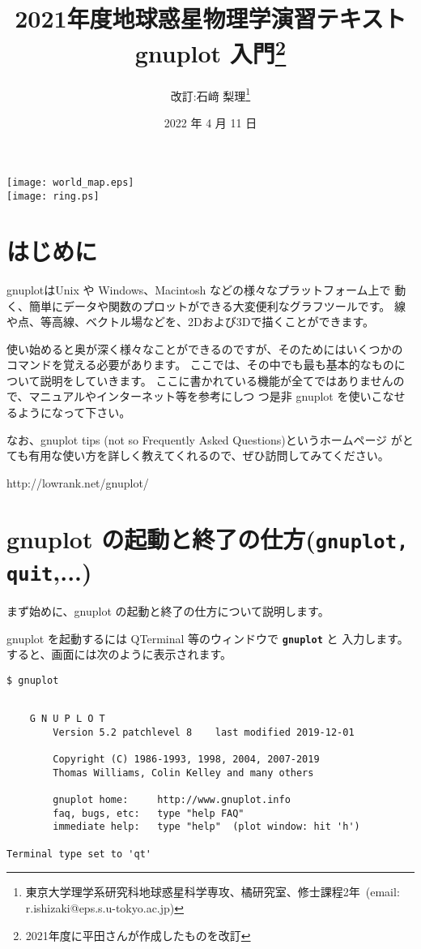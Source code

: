 \documentclass[a4j]{ujarticle} %
\title{2021年度地球惑星物理学演習テキスト \\
       gnuplot 入門\thanks{2021年度に平田さんが作成したものを改訂}}
\date{2022 年 4 月 11 日}
\author{改訂:石﨑 梨理\thanks{
    東京大学理学系研究科地球惑星科学専攻、橘研究室、修士課程2年\, 
(email: r.ishizaki@eps.s.u-tokyo.ac.jp)}}
\begin{document}
\maketitle

\begin{center}
 \texttt{[image: world\_map.eps]}\\
 \texttt{[image: ring.ps]}
\end{center}

\newpage
\setcounter{section}{-1}

\section{はじめに}
gnuplotはUnix や Windows、Macintosh などの様々なプラットフォーム上で
動く、簡単にデータや関数のプロットができる大変便利なグラフツールです。
線や点、等高線、ベクトル場などを、2Dおよび3Dで描くことができます。

使い始めると奥が深く様々なことができるのですが、そのためにはいくつかの
コマンドを覚える必要があります。
ここでは、その中でも最も基本的なものについて説明をしていきます。
ここに書かれている機能が全てではありませんので、マニュアルやインターネット等を参考にしつ
つ是非 gnuplot を使いこなせるようになって下さい。

なお、gnuplot tips (not so Frequently Asked Questions)というホームページ
がとても有用な使い方を詳しく教えてくれるので、ぜひ訪問してみてください。\\
\begin{center}
http://lowrank.net/gnuplot/
\end{center}

\section{gnuplot の起動と終了の仕方({\tt\bf gnuplot, quit},...)}
まず始めに、gnuplot の起動と終了の仕方について説明します。

gnuplot を起動するには QTerminal 等のウィンドウで {\tt\bf gnuplot} と
入力します。すると、画面には次のように表示されます。\\
\begin{framed}
 \begin{minipage}{0.95\textwidth}
  \texttt{\$ gnuplot}
  {\small
  \begin{verbatim}
  
  	G N U P L O T
        Version 5.2 patchlevel 8    last modified 2019-12-01 

        Copyright (C) 1986-1993, 1998, 2004, 2007-2019
        Thomas Williams, Colin Kelley and many others

        gnuplot home:     http://www.gnuplot.info
        faq, bugs, etc:   type "help FAQ"
        immediate help:   type "help"  (plot window: hit 'h')

Terminal type set to 'qt'
  \end{verbatim}
  }
 \end{minipage}
\end{framed}
\end{document}
